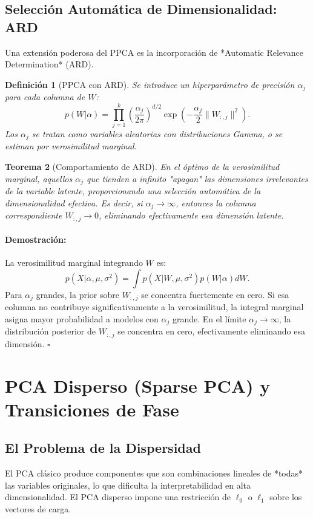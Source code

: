 \documentclass[11pt]{article}
\theoremstyle{plain}
\newtheorem{theorem}{Teorema}[section]
\newtheorem{definition}[theorem]{Definición}
\newenvironment{proof}{\paragraph{Demostración:}}{\hfill$\square$}
\begin{document}
\subsection{Selección Automática de Dimensionalidad: ARD}

Una extensión poderosa del PPCA es la incorporación de *Automatic Relevance Determination* (ARD).

\begin{definition}[PPCA con ARD]
Se introduce un hiperparámetro de precisión $\alpha_j$ para cada columna de $W$:
\[
p(W | \alpha) = \prod_{j=1}^k \left( \frac{\alpha_j}{2\pi} \right)^{d/2} \exp\left( -\frac{\alpha_j}{2} \|W_{:,j}\|^2 \right).
\]
Los $\alpha_j$ se tratan como variables aleatorias con distribuciones Gamma, o se estiman por verosimilitud marginal.
\end{definition}

\begin{theorem}[Comportamiento de ARD]
En el óptimo de la verosimilitud marginal, aquellos $\alpha_j$ que tienden a infinito "apagan" las dimensiones irrelevantes de la variable latente, proporcionando una selección automática de la dimensionalidad efectiva. Es decir, si $\alpha_j \to \infty$, entonces la columna correspondiente $W_{:,j} \to 0$, eliminando efectivamente esa dimensión latente.
\end{theorem}

\begin{proof}
La verosimilitud marginal integrando $W$ es:
\[
p(X | \alpha, \mu, \sigma^2) = \int p(X | W, \mu, \sigma^2) p(W | \alpha) dW.
\]
Para $\alpha_j$ grandes, la prior sobre $W_{:,j}$ se concentra fuertemente en cero. Si esa columna no contribuye significativamente a la verosimilitud, la integral marginal asigna mayor probabilidad a modelos con $\alpha_j$ grande. En el límite $\alpha_j \to \infty$, la distribución posterior de $W_{:,j}$ se concentra en cero, efectivamente eliminando esa dimensión.
\end{proof}

\section{PCA Disperso (Sparse PCA) y Transiciones de Fase}

\subsection{El Problema de la Dispersidad}

El PCA clásico produce componentes que son combinaciones lineales de *todas* las variables originales, lo que dificulta la interpretabilidad en alta dimensionalidad. El PCA disperso impone una restricción de $\ell_0$ o $\ell_1$ sobre los vectores de carga.
\end{document}
